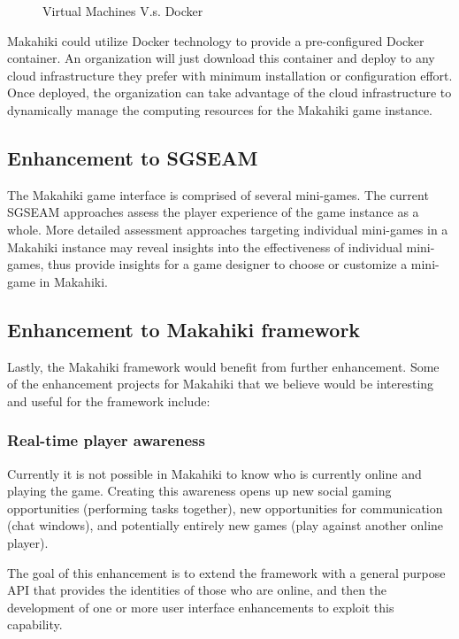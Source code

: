 \begin{figure}[ht!]
	\centering
		\caption{Virtual Machines V.s. Docker \cite {docker}}
		\label{fig:docker}
\end{figure}

Makahiki could utilize Docker technology to provide a pre-configured Docker container. An organization will just download this container and deploy to any cloud infrastructure they prefer with minimum installation or configuration effort. Once deployed, the organization can take advantage of the cloud infrastructure to dynamically manage the computing resources for the Makahiki game instance.

\subsection{Enhancement to SGSEAM}

The Makahiki game interface is comprised of several mini-games. The current SGSEAM approaches assess the player experience of the game instance as a whole. More detailed assessment approaches targeting individual mini-games in a Makahiki instance may reveal insights into the effectiveness of individual mini-games, thus provide insights for a game designer to choose or customize a mini-game in Makahiki.

\subsection{Enhancement to Makahiki framework}
Lastly, the Makahiki framework would benefit from further enhancement. Some of the enhancement projects for Makahiki that we believe would be interesting and useful for the framework include:

\subsubsection{Real-time player awareness}
Currently it is not possible in Makahiki to know who is currently online and playing the game. Creating this awareness opens up new social gaming opportunities (performing tasks together), new opportunities for communication (chat windows), and potentially entirely new games (play against another online player). 

The goal of this enhancement is to extend the framework with a general purpose API that provides the identities of those who are online, and then the development of one or more user interface enhancements to exploit this capability.

